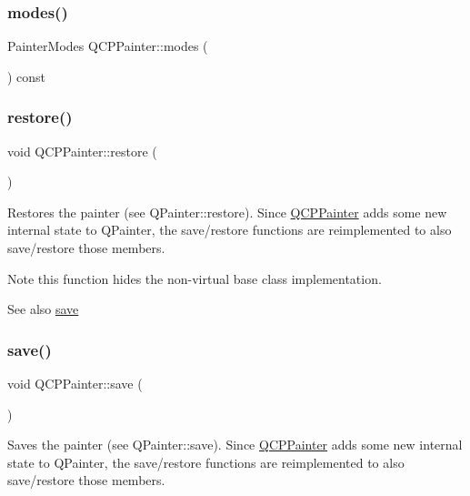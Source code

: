 \subsubsection{\texorpdfstring{modes()}{modes()}}
{\footnotesize\ttfamily Painter\+Modes Q\+C\+P\+Painter\+::modes (\begin{DoxyParamCaption}{ }\end{DoxyParamCaption}) const\hspace{0.3cm}{\ttfamily [inline]}}

\mbox{\label{class_q_c_p_painter_a64908e6298d5bbd83457dc987cc3a022}} 
\subsubsection{\texorpdfstring{restore()}{restore()}}
{\footnotesize\ttfamily void Q\+C\+P\+Painter\+::restore (\begin{DoxyParamCaption}{ }\end{DoxyParamCaption})}

Restores the painter (see Q\+Painter\+::restore). Since \mbox{\hyperlink{class_q_c_p_painter}{Q\+C\+P\+Painter}} adds some new internal state to Q\+Painter, the save/restore functions are reimplemented to also save/restore those members.

\begin{DoxyNote}{Note}
this function hides the non-\/virtual base class implementation.
\end{DoxyNote}
\begin{DoxySeeAlso}{See also}
\mbox{\hyperlink{class_q_c_p_painter_a8fd6821ee6fecbfa04444c9062912abd}{save}} 
\end{DoxySeeAlso}
\mbox{\label{class_q_c_p_painter_a8fd6821ee6fecbfa04444c9062912abd}} 
\subsubsection{\texorpdfstring{save()}{save()}}
{\footnotesize\ttfamily void Q\+C\+P\+Painter\+::save (\begin{DoxyParamCaption}{ }\end{DoxyParamCaption})}

Saves the painter (see Q\+Painter\+::save). Since \mbox{\hyperlink{class_q_c_p_painter}{Q\+C\+P\+Painter}} adds some new internal state to Q\+Painter, the save/restore functions are reimplemented to also save/restore those members.

